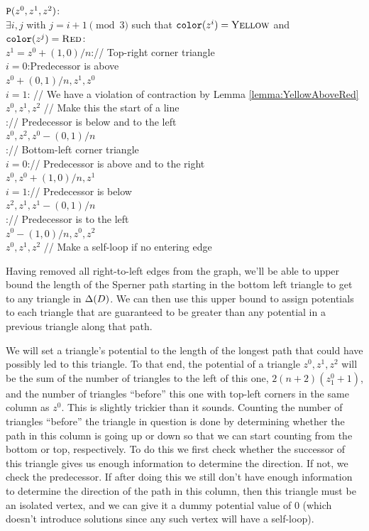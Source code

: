   \begin{algo}
    $\operatorname{\texttt{P}}(z^0,z^1,z^2)$:\+
    \\ \IfB $\exists i,j$ with $j = i + 1 \pmod{3}$ such that $\operatorname{\texttt{color}}(z^i) = \textsc{Yellow}$ and $\operatorname{\texttt{color}}(z^j) = \textsc{Red}$:\+
    \\   \IfB $z^1 = z^0 + (1,0)/n$:\quad // Top-right corner triangle\+    
    \\     \IfB $i = 0$:\quad Predecessor is above\+
    \\       \ReturnB $z^0+(0,1)/n,z^1,z^0$\-
    \\     \ElseIfB $i = 1$: \quad// We have a violation of contraction by Lemma \ref{lemma:YellowAboveRed}\+
    \\       \ReturnB $z^0,z^1,z^2$ \quad// Make this the start of a line\-
    \\     \ElseB:\quad // Predecessor is below and to the left\+
    \\       \ReturnB $z^0,z^2,z^0 - (0,1)/n$\-\-
    \\   \ElseB:\quad // Bottom-left corner triangle\+
    \\     \IfB $i = 0$:\quad // Predecessor is above and to the right\+
    \\       \ReturnB $z^0,z^0+(1,0)/n,z^1$\-
    \\     \ElseIfB $i = 1$:\quad // Predecessor is below\+ 
    \\       \ReturnB $z^2,z^1,z^1-(0,1)/n$\-
    \\     \ElseB:\quad // Predecessor is to the left\+
    \\       \ReturnB $z^0-(1,0)/n,z^0,z^2$\-\-\-
    \\ \ReturnB $z^0,z^1,z^2$ \quad// Make a self-loop if no entering edge
  \end{algo}
  
  Having removed all right-to-left edges from the \EOPL graph, we'll be able to upper bound the length of the Sperner path starting in the bottom left triangle to get to any triangle in $\Delta(D)$. We can then use this upper bound to assign potentials to each triangle that are guaranteed to be greater than any potential in a previous triangle along that path.

  We will set a triangle's potential to the length of the longest path that could have possibly led to this triangle. To that end, the potential of a triangle $z^0,z^1,z^2$ will be the sum of the number of triangles to the left of this one, $2(n+2)(z^0_1 + 1)$, and the number of triangles ``before'' this one with top-left corners in the same column as $z^0$. This is slightly trickier than it sounds. 
  Counting the number of triangles ``before'' the triangle in question is done by determining whether the path in this column is going up or down so that we can start counting from the bottom or top, respectively. To do this we first check whether the successor of this triangle gives us enough information to determine the direction. If not, we check the predecessor. If after doing this we still don't have enough information to determine the direction of the path in this column, then this triangle must be an isolated vertex, and we can give it a dummy potential value of $0$ (which doesn't introduce solutions since any such vertex will have a self-loop).

